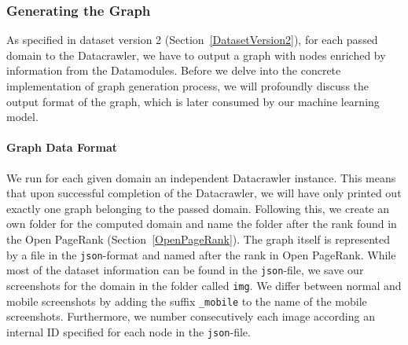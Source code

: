 \subsubsection{Generating the Graph}
\label{datacrawler_graph}
As specified in dataset version 2 (Section~\ref{DatasetVersion2}), for each passed domain to the Datacrawler, we have to output a graph with nodes enriched by information from the Datamodules. Before we delve into the concrete implementation of graph generation process, we will profoundly discuss the output format of the graph, which is later consumed by our machine learning model.

\paragraph*{Graph Data Format}
We run for each given domain an independent Datacrawler instance. This means that upon successful completion of the Datacrawler, we will have only printed out exactly one graph belonging to the passed domain. Following this, we create an own folder for the computed domain and name the folder after the rank found in the Open PageRank (Section~\ref{OpenPageRank}). The graph itself is represented by a file in the \texttt{json}-format and named after the rank in Open PageRank. While most of the dataset information can be found in the \texttt{json}-file, we save our screenshots for the domain in the folder called \texttt{img}. We differ between normal and mobile screenshots by adding the suffix \texttt{\_mobile} to the name of the mobile screenshots. Furthermore, we number consecutively each image according an internal ID specified for each node in the \texttt{json}-file.

